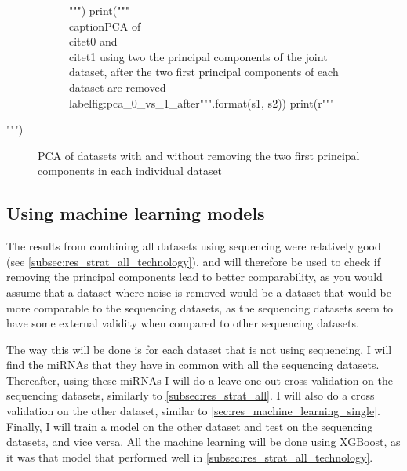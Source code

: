 {{{{{{{{{{{{\begin{pycode}
\begin{figure}
\begin{subfigure}[t]{0.48\textwidth}
{\begin{tikzpicture}
\begin{axis}[
                        xlabel={Principal Component 1},
                        ylabel={Principal Component 2},
                    ]
{                                A={green},
                                B={red}
                            },
                        table/col sep=comma,
                        mark size=1pt
                    ]""")
    print("""table[x=PCA1,y=PCA2,meta=Type]{{{2}}};
                    \\legend{{\\citet{{{0}}}, \\citet{{{1}}}}}""".format(s1, s2, base_dir + "After/" + f))
    print(r"""  \end{axis}
            \end{tikzpicture}
            }""")
    print("""\\caption{{PCA of \\citet{{{0}}} and \\citet{{{1}}} using two the principal components of the joint dataset, after the two first principal components of each dataset are removed}}
        \\label{{fig:pca_{0}_vs_{1}_after}}""".format(s1, s2))
    print(r"""\end{subfigure}\end{figure}""")
\end{pycode}
\begin{figure}
\caption{PCA of datasets with and without removing the two first principal components in each individual dataset}
\label{fig:pca_remove_two}
\end{figure}

\subsection{Using machine learning models}
The results from combining all datasets using sequencing were relatively good (see \autoref{subsec:res_strat_all_technology}), and will therefore be used to check if removing the principal components lead to better comparability, as you would assume that a dataset where noise is removed would be a dataset that would be more comparable to the sequencing datasets, as the sequencing datasets seem to have some external validity when compared to other sequencing datasets.

The way this will be done is for each dataset that is not using sequencing, I will find the miRNAs that they have in common with all the sequencing datasets. Thereafter, using these miRNAs I will do a leave-one-out cross validation on the sequencing datasets, similarly to \autoref{subsec:res_strat_all}. I will also do a cross validation on the other dataset, similar to \autoref{sec:res_machine_learning_single}. Finally, I will train a model on the other dataset and test on the sequencing datasets, and vice versa. All the machine learning will be done using XGBoost, as it was that model that performed well in \autoref{subsec:res_strat_all_technology}.

}}}}}}}}}}}}
